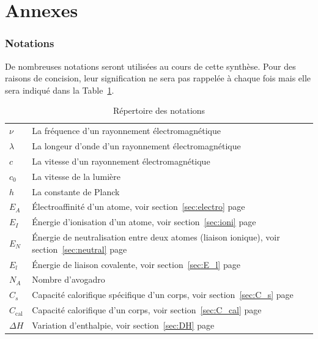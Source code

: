 \documentclass[11pt,a4paper,french]{article}
\newcommand\ccal{C_\mathrm{cal}}
\begin{document}
\part{Annexes}
\begin{appendices}

\section{Notations}
De nombreuses notations seront utilisées au cours de cette synthèse.
Pour des raisons de concision, leur signification ne sera pas rappelée à chaque fois mais elle sera indiqué dans la Table~\ref{tab:notations}.
\begin{table}[h!]
	\begin{center}
		\begin{tabular}{ll}
			$\nu$ & La fréquence d'un rayonnement électromagnétique\\
			$\lambda$ & La longeur d'onde d'un rayonnement électromagnétique\\
			$c$ & La vitesse d'un rayonnement électromagnétique\\
			$c_0$ & La vitesse de la lumière\\
			$h$ & La constante de Planck\\
			$E_A$ & \'Electroaffinité d'un atome,
			voir section~\ref{sec:electro} page~\pageref{sec:electro}\\
			$E_I$ & \'Energie d'ionisation d'un atome,
			voir section~\ref{sec:ioni} page~\pageref{sec:ioni}\\
			$E_N$ & \'Energie de neutralisation entre deux atomes (liaison ionique),
			voir section~\ref{sec:neutral} page~\pageref{sec:neutral}\\
			$E_l$ & \'Energie de liaison covalente,
			voir section~\ref{sec:E_l} page~\pageref{sec:E_l}\\ %
			$N_A$ & Nombre d'avogadro\\
			$C_s$ & Capacité calorifique spécifique d'un corps, voir section~\ref{sec:C_s} page~\pageref{sec:C_s}\\
			$\ccal$ & Capacité calorifique d'un corps, voir section~\ref{sec:C_cal} page~\pageref{sec:C_cal}\\
			$\Delta H$ & Variation d'enthalpie, voir section~\ref{sec:DH} page~\pageref{sec:DH}
		\end{tabular}
		\caption{Répertoire des notations}
		\label{tab:notations}
	\end{center}
\end{table}


\end{appendices}
\end{document}
